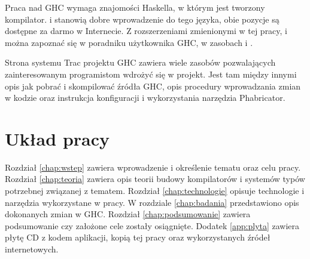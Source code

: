 Praca nad GHC wymaga znajomości Haskella, w którym jest tworzony
kompilator. \cite{LearnYouAHaskell} i \cite{RealWorldHaskell} stanowią dobre
wprowadzenie do tego języka, obie pozycje są dostępne za darmo w Internecie. Z
rozszerzeniami zmienionymi w tej pracy,  i
 można zapoznać się w poradniku użytkownika GHC, w
zasobach \cite{GuideTypeFamilies} i \cite{GuidePartialTypeSignatures}.

Strona systemu Trac projektu GHC zawiera wiele zasobów pozwalających
zainteresowanym programistom wdrożyć się w projekt. Jest tam między innymi opis
jak pobrać i skompilować źródła GHC\cite{WikiNewcomers}, opis procedury
wprowadzania zmian w kodzie\cite{WikiFixingBugs} oraz instrukcja konfiguracji i
wykorzystania narzędzia Phabricator\cite{WikiPhabricator}.


\section{Układ pracy}\label{sec:uklad_pracy}

Rozdział \ref{chap:wstep} zawiera wprowadzenie i określenie tematu oraz celu
pracy. Rozdział \ref{chap:teoria} zawiera opis teorii budowy kompilatorów i
systemów typów potrzebnej związanej z tematem. Rozdział \ref{chap:technologie}
opisuje technologie i narzędzia wykorzystane w pracy. W rozdziale
\ref{chap:badania} przedstawiono opis dokonanych zmian w GHC. Rozdział
\ref{chap:podsumowanie} zawiera podsumowanie czy założone cele zostały
osiągnięte. Dodatek \ref{app:plyta} zawiera płytę CD z kodem aplikacji,
kopią tej pracy oraz wykorzystanych źródeł internetowych.
